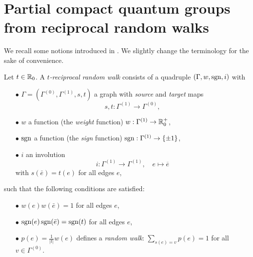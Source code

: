 





\section{Partial compact quantum groups from reciprocal random walks}

We recall some notions introduced in \cite{DCY1}. We slightly change the terminology for the sake of convenience.


\begin{Def} Let $t\in \mathbb{R}_0$. A \emph{$t$-reciprocal random walk} consists of a quadruple $(\Gamma,w,\operatorname{\mathrm{sgn}},i)$ with \begin{itemize}
\item[$\bullet$] $\Gamma=(\Gamma^{(0)},\Gamma^{(1)},s,t)$ a graph with \emph{source} and \emph{target} maps \[s,t:\Gamma^{(1)}\rightarrow \Gamma^{(0)},\]
\item[$\bullet$] $w$ a function (the \emph{weight} function) $w:\Gamma^{(1)}\rightarrow \mathbb{R}_0^+$,
\item[$\bullet$] $\operatorname{\mathrm{sgn}}$ a function (the \emph{sign} function) $\operatorname{\mathrm{sgn}}:\Gamma^{(1)}\rightarrow \{\pm 1\}$,
\item[$\bullet$] $i$ an involution \[i:\Gamma^{(1)} \rightarrow \Gamma^{(1)},\quad e\mapsto \overline{e}\] with $s(\bar{e}) = t(e)$ for all edges $e$,
\end{itemize}
such that the following conditions are satisfied:
\begin{itemize}
\item[$\bullet$] $w(e)w(\bar{e}) = 1$ for all edges $e$,
\item[$\bullet$] $\operatorname{\mathrm{sgn}}(e)\operatorname{\mathrm{sgn}}(\bar{e}) = \operatorname{\mathrm{sgn}}(t)$ for all edges $e$,
\item[$\bullet$] $p(e) = \frac{1}{|t|}w(e)$ defines a \emph{random walk}:   $\sum_{s(e)=v} p(e) = 1$ for all $v\in \Gamma^{(0)}$.
\end{itemize}
\end{Def}


